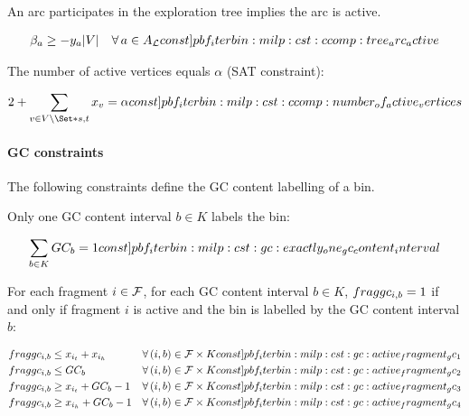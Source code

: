 An arc participates in the exploration tree implies the arc is active.
\begin{Constraint}
  \begin{align}
    \beta_a \geq - y_a |V| \quad \forall a \in A_\Links{}
    \cstlabel{pbf_iterbin:milp:cst:ccomp:tree_arc_active} %
  \end{align}
\end{Constraint}

The number of active vertices equals \(\alpha{}\) (SAT constraint):
\begin{Constraint}
  \begin{align}
    2 + \sum_{v \in V \setminus \Set*{s, t}} x_v = \alpha
    \cstlabel{pbf_iterbin:milp:cst:ccomp:number_of_active_vertices} %
  \end{align}
\end{Constraint}

\paragraph{GC constraints}
%
The following constraints define the GC content labelling of a bin.

\phantom{text}

Only one GC content interval \(b \in K\) labels the bin:
\begin{Constraint}
  \begin{equation}
    \sum_{b \in K} GC_b = 1
    \cstlabel{pbf_iterbin:milp:cst:gc:exactly_one_gc_content_interval} %
  \end{equation}
\end{Constraint}

For each fragment \(i \in \mathcal{F}{}\), for each GC content interval \(b \in K\), \(fraggc_{i, b} = 1\) if and only if fragment \(i\) is active and the bin is labelled by the GC content interval \(b\):
\begin{Constraint}
  \begin{align}
    \fraggc{i}{b} & \leq x_{i_t} + x_{i_h} & \forall (i, b) \in \Fragments{} \times K \cstlabel{pbf_iterbin:milp:cst:gc:active_fragment_gc_1} \\ %
    \fraggc{i}{b} & \leq GC_b & \forall (i, b) \in \Fragments{} \times K \cstlabel{pbf_iterbin:milp:cst:gc:active_fragment_gc_2} \\ %
    \fraggc{i}{b} & \geq x_{i_t} + GC_b - 1 & \forall (i, b) \in \Fragments{} \times K \cstlabel{pbf_iterbin:milp:cst:gc:active_fragment_gc_3} \\ %
    \fraggc{i}{b} & \geq x_{i_h} + GC_b - 1 & \forall (i, b) \in \Fragments{} \times K \cstlabel{pbf_iterbin:milp:cst:gc:active_fragment_gc_4} %
  \end{align}
\end{Constraint}


